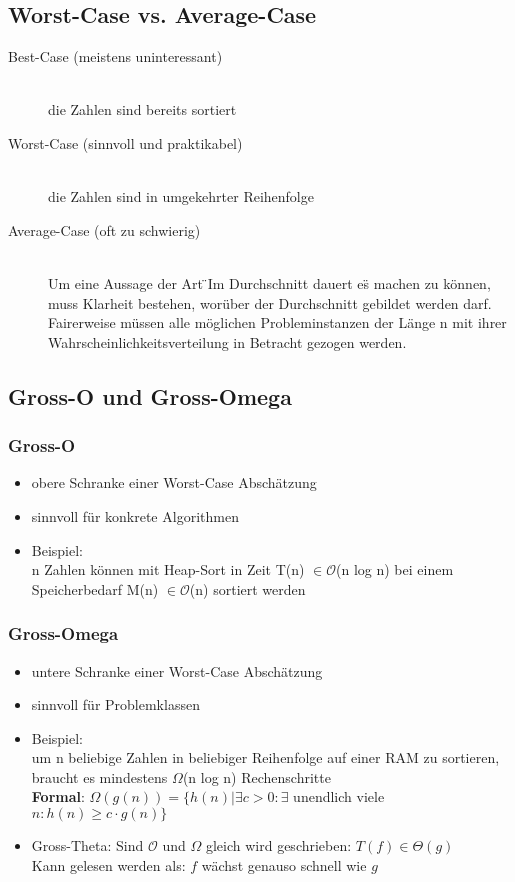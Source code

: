 \documentclass[a4paper,10pt]{article}
\newcommand{\Bold}[1]{\textbf{#1}} %
\begin{document}
\subsection{Worst-Case vs. Average-Case}
\begin{description}
		\item[Best-Case (meistens uninteressant)] \hfill \\
			die Zahlen sind bereits sortiert
		\item[Worst-Case (sinnvoll und praktikabel)] \hfill \\
			die Zahlen sind in umgekehrter Reihenfolge
		\item[Average-Case (oft zu schwierig)] \hfill \\
			Um eine Aussage der Art \"{ }Im Durchschnitt dauert es\"{ }  machen zu k\"onnen, muss Klarheit bestehen, wor\"uber der Durchschnitt gebildet werden darf. Fairerweise m\"ussen alle m\"oglichen Probleminstanzen der L\"ange n mit ihrer Wahrscheinlichkeitsverteilung in Betracht gezogen werden.
\end{description}

\subsection{Gross-O und Gross-Omega}
\subsubsection{Gross-O}
\begin{itemize}
	\item obere Schranke einer Worst-Case Absch\"atzung
	\item sinnvoll f\"ur konkrete Algorithmen
	\item Beispiel: \\
		n Zahlen k\"onnen mit Heap-Sort in Zeit T(n) $\in \mathcal{O}$(n log n) bei einem
Speicherbedarf M(n) $\in \mathcal{O}$(n) sortiert werden
\end{itemize}
\subsubsection{Gross-Omega}
\begin{itemize}
	\item untere Schranke einer Worst-Case Absch\"atzung
	\item sinnvoll f\"ur Problemklassen
	\item Beispiel: \\
		um n beliebige Zahlen in beliebiger Reihenfolge auf einer RAM zu sortieren, braucht es mindestens $\Omega$(n log n) Rechenschritte \\
	\Bold {Formal}: $ \Omega (g(n))  = \{  h(n) | \exists c > 0 : \exists $ unendlich viele $n:h(n) \geq c \cdot  g(n) \}$
	\item Gross-Theta: Sind $\mathcal{O}$ und $\Omega$ gleich wird  geschrieben: $T(f) \in \Theta(g)$ \\
	Kann gelesen werden als: \glqq $f$ w\"achst genauso schnell wie $g$\grqq
\end{itemize}
\pagebreak
\end{document}

